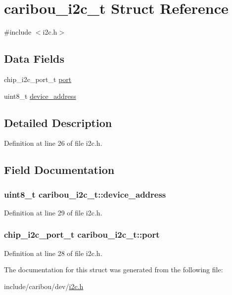 \hypertarget{structcaribou__i2c__t}{\section{caribou\-\_\-i2c\-\_\-t Struct Reference}
\label{structcaribou__i2c__t}
}


{\ttfamily \#include $<$i2c.\-h$>$}

\subsection*{Data Fields}
\begin{DoxyCompactItemize}
\item 
chip\-\_\-i2c\-\_\-port\-\_\-t \hyperlink{structcaribou__i2c__t_af3ea37eae556cf758bc347d1dd6274b0}{port}
\item 
uint8\-\_\-t \hyperlink{structcaribou__i2c__t_a6231ff9a19bc1e0abef8f6d036ccef7f}{device\-\_\-address}
\end{DoxyCompactItemize}


\subsection{Detailed Description}


Definition at line 26 of file i2c.\-h.



\subsection{Field Documentation}
\hypertarget{structcaribou__i2c__t_a6231ff9a19bc1e0abef8f6d036ccef7f}{
\subsubsection[{device\-\_\-address}]{\setlength{\rightskip}{0pt plus 5cm}uint8\-\_\-t caribou\-\_\-i2c\-\_\-t\-::device\-\_\-address}}\label{structcaribou__i2c__t_a6231ff9a19bc1e0abef8f6d036ccef7f}


Definition at line 29 of file i2c.\-h.

\hypertarget{structcaribou__i2c__t_af3ea37eae556cf758bc347d1dd6274b0}{
\subsubsection[{port}]{\setlength{\rightskip}{0pt plus 5cm}chip\-\_\-i2c\-\_\-port\-\_\-t caribou\-\_\-i2c\-\_\-t\-::port}}\label{structcaribou__i2c__t_af3ea37eae556cf758bc347d1dd6274b0}


Definition at line 28 of file i2c.\-h.



The documentation for this struct was generated from the following file\-:\begin{DoxyCompactItemize}
\item 
include/caribou/dev/\hyperlink{i2c_8h}{i2c.\-h}\end{DoxyCompactItemize}

